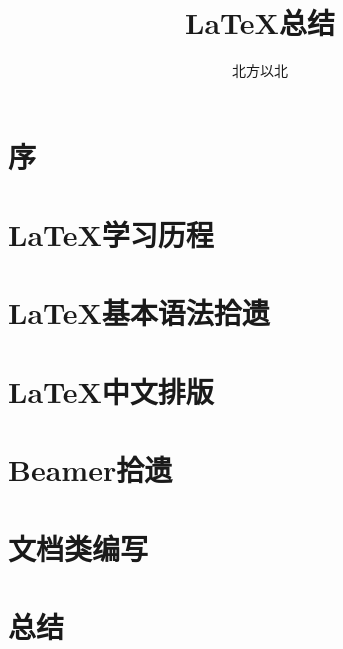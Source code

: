 \documentclass[11pt]{ctexart}
\title{\LaTeX 总结}
\author{北方以北}
\begin{document}
\maketitle

\section{序}

\section{\LaTeX 学习历程}

\section{\LaTeX 基本语法拾遗}

\section{\LaTeX 中文排版}

\section{Beamer拾遗}

\section{文档类编写}

\section{总结}
\end{document}
